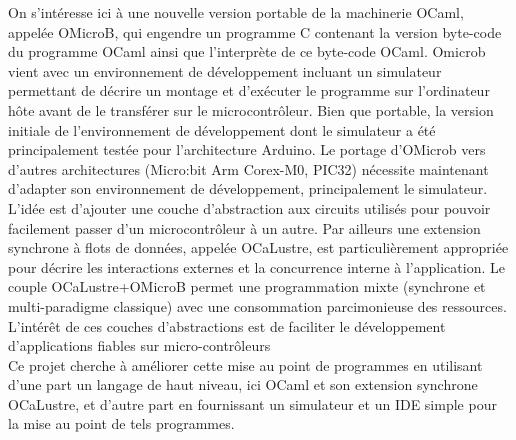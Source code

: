 \documentclass[14px]{article}
\begin{document}
On s'intéresse ici à une nouvelle version portable de la machinerie OCaml, appelée OMicroB, qui engendre un programme C contenant la version byte-code du programme OCaml ainsi que l'interprète de ce byte-code OCaml. Omicrob vient avec un environnement de développement incluant un simulateur permettant de décrire un montage et d'exécuter le programme sur l'ordinateur hôte avant de le transférer sur le microcontrôleur. Bien que portable, la version initiale de l'environnement de développement dont le simulateur a été principalement testée pour l'architecture Arduino. Le portage d'OMicrob vers d'autres architectures (Micro:bit Arm Corex-M0, PIC32) nécessite maintenant d'adapter son environnement de développement, principalement le simulateur. L'idée est d'ajouter une couche d'abstraction aux circuits utilisés pour pouvoir facilement passer d'un microcontrôleur à un autre. Par ailleurs une extension synchrone à flots de données, appelée OCaLustre, est particulièrement appropriée pour décrire les interactions externes et la concurrence interne à l'application. Le couple OCaLustre+OMicroB permet une programmation mixte (synchrone et multi-paradigme classique) avec une consommation parcimonieuse des ressources. L'intérêt de ces couches d'abstractions est de faciliter le développement d'applications fiables sur micro-contrôleurs\\

Ce projet cherche à améliorer cette mise au point de programmes en utilisant d'une part un langage de haut niveau, ici OCaml et son extension synchrone OCaLustre, et d'autre part en fournissant un simulateur et un IDE simple pour la mise au point de tels programmes.

\clearpage
\pagestyle{fancy}
\rhead{\thepage}
\fancyfoot{}
\end{document}
